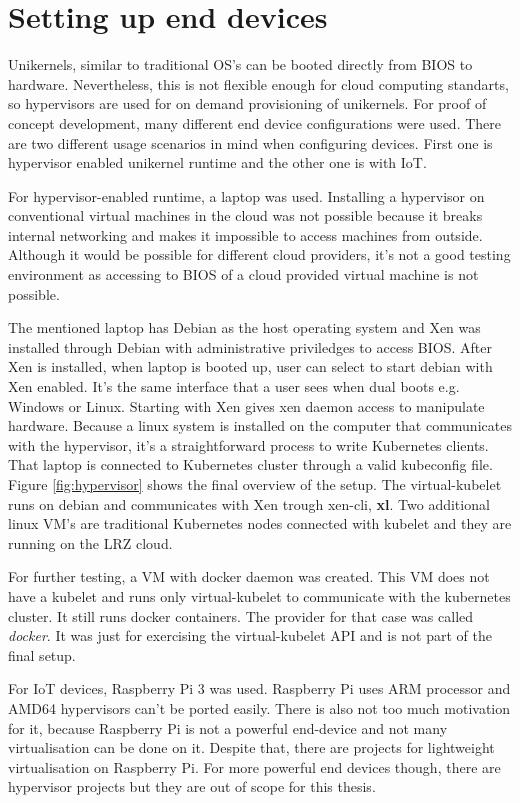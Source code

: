
\section{Setting up end devices}
Unikernels, similar to traditional OS's can be booted directly from BIOS to hardware. Nevertheless, this is not flexible enough for cloud computing standarts, so hypervisors are used for on demand provisioning of unikernels. For proof of concept development, many different end device configurations were used. There are two different usage scenarios in mind when configuring devices. First one is hypervisor enabled unikernel runtime and the other one is with IoT.

For hypervisor-enabled runtime, a laptop was used. Installing a hypervisor on conventional virtual machines in the cloud was not possible because it breaks internal networking and makes it impossible to access machines from outside. Although it would be possible for different cloud providers, it's not a good testing environment as accessing to BIOS of a cloud provided virtual machine is not possible.

The mentioned laptop has Debian as the host operating system and Xen was installed through Debian with administrative priviledges to access BIOS. After Xen is installed, when laptop is booted up, user can select to start debian with Xen enabled. It's the same interface that a user sees when dual boots e.g. Windows or Linux. Starting with Xen gives xen daemon access to manipulate hardware. Because a linux system is installed on the computer that communicates with the hypervisor, it's a straightforward process to write Kubernetes clients. That laptop is connected to Kubernetes cluster through a valid kubeconfig file. Figure \ref{fig:hypervisor} shows the final overview of the setup. The virtual-kubelet runs on debian and communicates with Xen trough xen-cli, \textbf{xl}. Two additional linux VM's are traditional Kubernetes nodes connected with kubelet and they are running on the LRZ cloud.

For further testing, a VM with docker daemon was created. This VM does not have a kubelet and runs only virtual-kubelet to communicate with the kubernetes cluster. It still runs docker containers. The provider for that case was called \textit{docker}. It was just for exercising the virtual-kubelet API and is not part of the final setup.

For IoT devices, Raspberry Pi 3 was used. Raspberry Pi uses ARM processor and AMD64 hypervisors can't be ported easily. There is also not too much motivation for it, because Raspberry Pi is not a powerful end-device and not many virtualisation can be done on it. Despite that, there are projects for lightweight virtualisation on Raspberry Pi. For more powerful end devices though, there are hypervisor projects but they are out of scope for this thesis.

